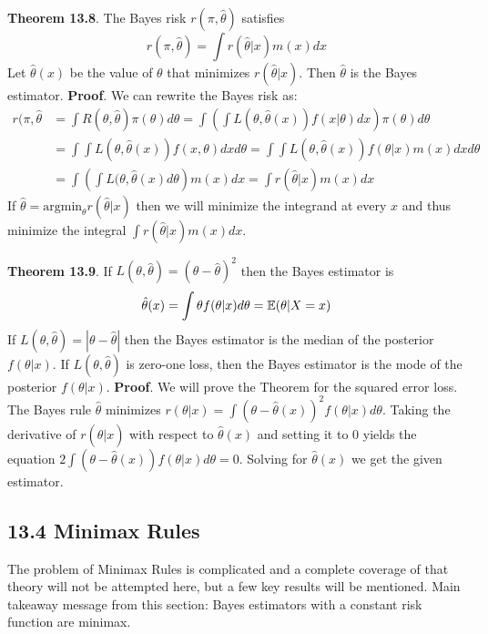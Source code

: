 \textbf{Theorem 13.8}. The Bayes risk \(r(\pi, \hat{\theta})\) satisfies
\[
r(\pi, \hat{\theta}) = \int r(\hat{\theta} | x) m(x) dx
\]
Let \(\hat{\theta}(x)\) be the value of \(\theta\) that minimizes
\(r(\hat{\theta} | x)\). Then \(\hat{\theta}\) is the Bayes estimator.
\textbf{Proof}. We can rewrite the Bayes risk as:
\begin{align*}
r(\pi, \hat{\theta} &= \int R(\theta, \hat{\theta}) \pi(\theta) d\theta = \int \left( \int L(\theta, \hat{\theta}(x)) f(x | \theta) dx \right) \pi(\theta) d\theta \\
&= \int \int L(\theta, \hat{\theta}(x)) f(x, \theta) dx d\theta = \int \int L(\theta, \hat{\theta}(x)) f(\theta | x) m(x) dx d\theta \\
&= \int \left(\int L(\theta, \hat{\theta}(x) d\theta \right) m(x) dx = \int r(\hat{\theta} | x) m(x) dx
\end{align*}
If \(\hat{\theta} = \text{argmin}_\theta r(\hat{\theta} | x)\) then we
will minimize the integrand at every \(x\) and thus minimize the
integral \(\int r(\hat{\theta} | x)m(x) dx\).

\textbf{Theorem 13.9}. If
\(L(\theta, \hat{\theta}) = (\theta - \hat{\theta})^{2}\) then the Bayes
estimator is
\[
\hat{\theta}(x) = \int \theta f(\theta | x) d\theta = \operatorname{\mathbb{E}}(\theta | X = x)
\]
If \(L(\theta, \hat{\theta}) = |\theta - \hat{\theta}|\) then the Bayes
estimator is the median of the posterior \(f(\theta | x)\). If
\(L(\theta, \hat{\theta})\) is zero-one loss, then the Bayes estimator
is the mode of the posterior \(f(\theta | x)\).
\textbf{Proof}. We will prove the Theorem for the squared error loss.
The Bayes rule \(\hat{\theta}\) minimizes
\(r(\theta | x) = \int (\theta - \hat{\theta}(x))^{2} f(\theta | x) d\theta\).
Taking the derivative of \(r(\hat{\theta} | x)\) with respect to
\(\hat{\theta}(x)\) and setting it to 0 yields the equation
\(2 \int (\theta - \hat{\theta}(x)) f(\theta | x) d\theta = 0\). Solving
for \(\hat{\theta}(x)\) we get the given estimator.

\subsection*{13.4 Minimax Rules}\label{minimax-rules}
The problem of Minimax Rules is complicated and a complete coverage of
that theory will not be attempted here, but a few key results will be
mentioned. Main takeaway message from this section: Bayes estimators
with a constant risk function are minimax.

